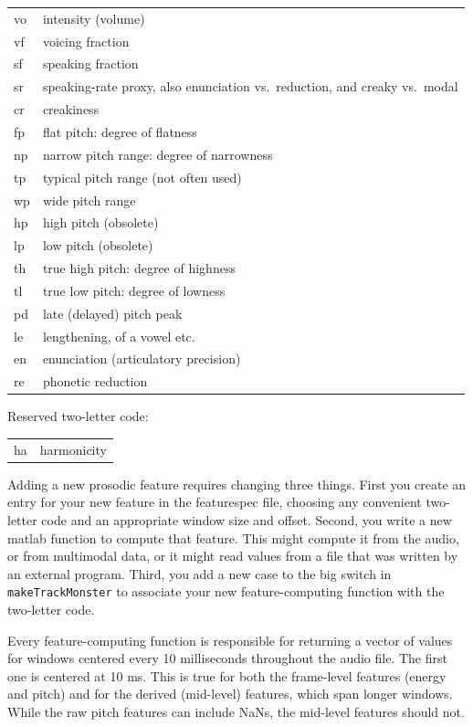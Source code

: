 \documentclass[11pt]{article}
\begin{document}
\begin{tabular}{ll}
  vo  & intensity (volume) \\
  vf  & voicing fraction \\
  sf  & speaking fraction \\
  sr  & speaking-rate proxy, also enunciation vs.~reduction, and creaky vs.~modal \\
  cr  & creakiness \\
  fp  & flat pitch: degree of flatness \\
  np  & narrow pitch range: degree of narrowness \\
  tp  & typical pitch range (not often used)\\
  wp  & wide pitch range  \\
  hp  & high pitch (obsolete) \\ 
  lp  & low pitch (obsolete) \\
  th  & true high pitch: degree of highness  \\ 
  tl  & true low pitch: degree of lowness \\
  pd  & late (delayed) pitch peak \\
  le  & lengthening, of a vowel etc. \\
  en  & enunciation (articulatory precision) \\
  re  & phonetic reduction \\
\end{tabular}

Reserved two-letter code: 

\begin{tabular}{ll}  
  ha      & harmonicity \\
\end{tabular}

Adding a new prosodic feature requires changing three things.  First
you create an entry for your new feature in the featurespec file,
choosing any convenient two-letter code and an appropriate window size
and offset.  Second, you write a new matlab function to compute that
feature.  This might compute it from the audio, or from multimodal
data, or it might read values from a file that was written by an
external program.  Third, you add a new case to the big switch in {\tt
  makeTrackMonster} to associate your new feature-computing function
with the two-letter code.

Every feature-computing function is responsible for returning a vector
of values for windows centered every 10 milliseconds throughout the
audio file.  The first one is centered at 10 ms.  This is true for
both the frame-level features (energy and pitch) and for the derived
(mid-level) features, which span longer windows.  While the raw pitch
features can include NaNs, the mid-level features should not.
\end{document}
